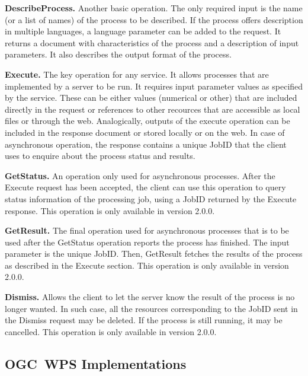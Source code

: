 \noindent \textbf{DescribeProcess.} Another basic operation. The only
required input is the name (or a list of names) of the process to be
described. \cite{despro} If the process offers description in multiple languages, a
language parameter can be added to the request. It returns a document
with characteristics of the process and a description of input
parameters. It also describes the output format of the process.

\noindent \textbf{Execute.} The key operation for any  
service. It allows processes that are implemented by a server to be
run. \cite{execute} It requires input parameter values as specified by the
service. These can be either values (numerical or other) that are
included directly in the request or references to other recources that
are accessible as local files or through the web. Analogically,
outputs of the execute operation can be included in the 
response document or stored locally or on the web. In case of asynchronous
operation, the response contains a unique JobID that the client uses
to enquire about the process status and results.

\noindent \textbf{GetStatus.} An operation only used for asynchronous
processes. After the Execute request has been accepted, the client can
use this operation to query status information of the processing job,
using a JobID returned by the Execute response. \cite{getstat} This operation is only
available in version 2.0.0.

\noindent \textbf{GetResult.} The final operation used for
asynchronous processes that is to be used after the GetStatus
operation reports the process has finished. The input parameter is the
unique JobID. \cite{getres} Then, GetResult fetches the results of the process as
described in the Execute section. This operation is only available in
version 2.0.0.

\noindent \textbf{Dismiss.} Allows the client to let the server know
the result of the process is no longer wanted. In such case, all the
resources corresponding to the JobID sent in the Dismiss request may
be deleted. \cite{dismiss} If the process is still running, it may be cancelled. This
operation is only available in version 2.0.0.

\subsection{OGC\ WPS Implementations}

